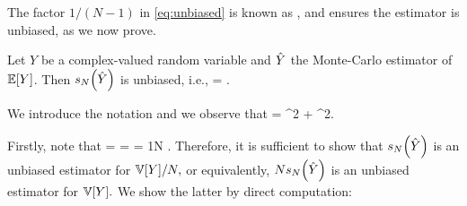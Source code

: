 The factor $1/(N-1)$ in \cref{eq:unbiased} is known as , and ensures the estimator is unbiased, as we now prove.

\label{lem:unbiased}
Let $Y$ be a complex-valued random variable and  $\hat{Y}$ the Monte-Carlo estimator of $\EXP{Y}$. Then $\unbiased{\Yhat}{N}$ is unbiased, i.e.,
\beqs
{} = \VAR{\Yhat}.
\eeqs
\ele

We introduce the notation
\beqs
\mu \de {}\quad\tand\quad\sigma \de {}
\eeqs
and we observe that
\beq\label{eq:varrelation}
 = \sigma^2 + \mu^2.
\eeq

Firstly, note that
\beqs
\VAR{\Yhat} =  =   = \frac1N .
\eeqs
Therefore, it is sufficient to show that $\unbiased{\Yhat}{N}$ is an unbiased estimator for $\VAR{Y}/N,$ or equivalently, $N\unbiased{\Yhat}{N}$ is an unbiased estimator for $\VAR{Y}.$ We show the latter by direct computation:
